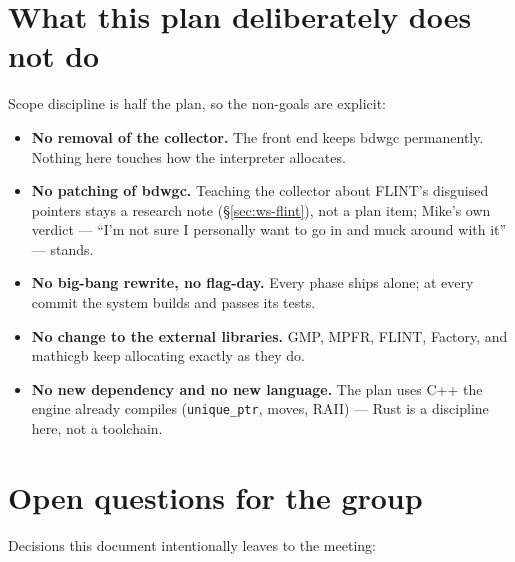 \documentclass[11pt,oneside]{report}
\newcommand{\code}[1]{\textcolor{m2code}{\texttt{#1}}}
\begin{document}
\section{What this plan deliberately does not do}
\label{sec:notdo}

Scope discipline is half the plan, so the non-goals are explicit:

\begin{itemize}
\item \textbf{No removal of the collector.} The front end keeps bdwgc
  permanently. Nothing here touches how the interpreter allocates.
\item \textbf{No patching of bdwgc.} Teaching the collector about FLINT's
  disguised pointers stays a research note (\S\ref{sec:ws-flint}), not a
  plan item; Mike's own verdict --- ``I'm not sure I personally want to go in
  and muck around with it'' --- stands.
\item \textbf{No big-bang rewrite, no flag-day.} Every phase ships alone;
  at every commit the system builds and passes its tests.
\item \textbf{No change to the external libraries.} GMP, MPFR, FLINT,
  Factory, and mathicgb keep allocating exactly as they do.
\item \textbf{No new dependency and no new language.} The plan uses C++
  the engine already compiles (\code{unique\_ptr}, moves, RAII) --- Rust is
  a discipline here, not a toolchain.
\end{itemize}

\section{Open questions for the group}
\label{sec:openq}

Decisions this document intentionally leaves to the meeting:
\end{document}
